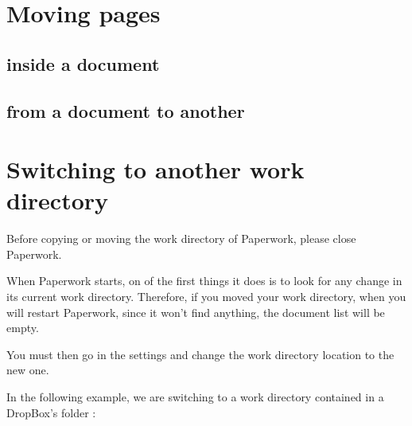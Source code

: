 \documentclass[10pt,a4paper]{article}
\begin{document}

\section{Moving pages}

\subsection{inside a document}

\subsection{from a document to another}

\section{Switching to another work directory}

Before copying or moving the work directory of Paperwork, please close
Paperwork.

When Paperwork starts, on of the first things it does is to look for
any change in its current work directory. Therefore, if you moved
your work directory, when you will restart Paperwork, since it won't
find anything, the document list will be empty.

You must then go in the settings and change the work directory location
to the new one.

In the following example, we are switching to a work directory contained
in a DropBox's folder :

%

\end{document}
